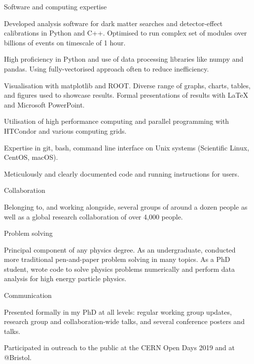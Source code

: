 
\newcommand{\vpaddingskills}{\vspace{1mm}}

\begin{cventries}
    \cventry
    {} %
    {Software and computing expertise} %
    {} %
    {} %
    {
      \begin{cvitems}
        \item {Developed analysis software for dark matter searches and detector-effect calibrations in Python and C++. Optimised to run complex set of modules over billions of events on timescale of 1 hour.}
        \item {High proficiency in Python and use of data processing libraries like numpy and pandas. Using fully-vectorised approach often to reduce inefficiency.}
        \item {Visualisation with matplotlib and ROOT. Diverse range of graphs, charts, tables, and figures used to showcase results. Formal presentations of results with LaTeX and Microsoft PowerPoint.}
        \item {Utilisation of high performance computing and parallel programming with HTCondor and various computing grids.}
        \item{Expertise in git, bash, command line interface on Unix systems (Scientific Linux, CentOS, macOS).}
        \item {Meticulously and clearly documented code and running instructions for users.}
        \vpaddingskills
        \end{cvitems}
    }

    \cventry
    {}
    {Collaboration}
    {}
    {}
    {
      \begin{cvitems}
        \item {Belonging to, and working alongside, several groups of around a dozen people as well as a global research collaboration of over 4,000 people.}
        \vpaddingskills
        \end{cvitems}
    }

    \cventry
    {}
    {Problem solving}
    {}
    {}
    {
      \begin{cvitems}
        \item {Principal component of any physics degree. As an undergraduate, conducted more traditional pen-and-paper problem solving in many topics. As a PhD student, wrote code to solve physics problems numerically and perform data analysis for high energy particle physics.}
        \vpaddingskills
        \end{cvitems}
    }

    \cventry
    {}
    {Communication}
    {}
    {}
    {
      \begin{cvitems}
        \item {Presented formally in my PhD at all levels: regular working group updates, research group and collaboration-wide talks, and several conference posters and talks.}
        \item {Participated in outreach to the public at the CERN Open Days 2019 and at @Bristol.}
        \end{cvitems}
    }

\end{cventries}
